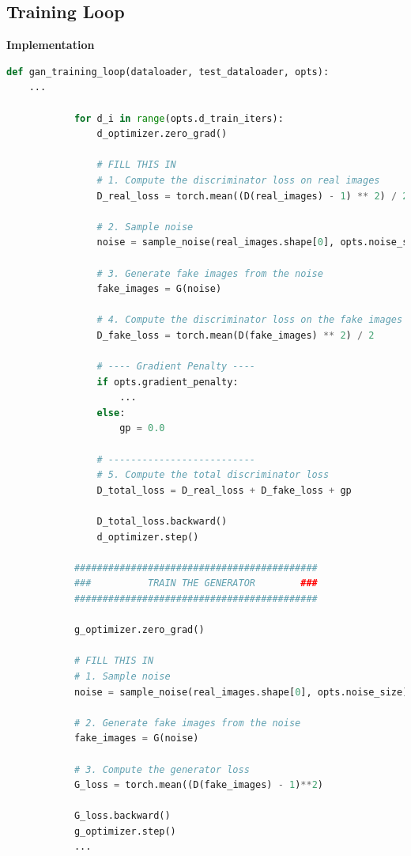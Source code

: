 \documentclass{article}
\begin{document}
	\subsection{Training Loop}
	\textbf{Implementation}
	\begin{lstlisting}[language=python]
def gan_training_loop(dataloader, test_dataloader, opts):
    ...

            for d_i in range(opts.d_train_iters):
                d_optimizer.zero_grad()

                # FILL THIS IN
                # 1. Compute the discriminator loss on real images
                D_real_loss = torch.mean((D(real_images) - 1) ** 2) / 2

                # 2. Sample noise
                noise = sample_noise(real_images.shape[0], opts.noise_size)

                # 3. Generate fake images from the noise
                fake_images = G(noise)
                
                # 4. Compute the discriminator loss on the fake images
                D_fake_loss = torch.mean(D(fake_images) ** 2) / 2

                # ---- Gradient Penalty ----
                if opts.gradient_penalty:
                    ...
                else:
                    gp = 0.0

                # --------------------------
                # 5. Compute the total discriminator loss
                D_total_loss = D_real_loss + D_fake_loss + gp

                D_total_loss.backward()
                d_optimizer.step()

            ###########################################
            ###          TRAIN THE GENERATOR        ###
            ###########################################

            g_optimizer.zero_grad()

            # FILL THIS IN
            # 1. Sample noise
            noise = sample_noise(real_images.shape[0], opts.noise_size)

            # 2. Generate fake images from the noise
            fake_images = G(noise)

            # 3. Compute the generator loss
            G_loss = torch.mean((D(fake_images) - 1)**2)

            G_loss.backward()
            g_optimizer.step()
            ...
	\end{lstlisting}
\end{document}

